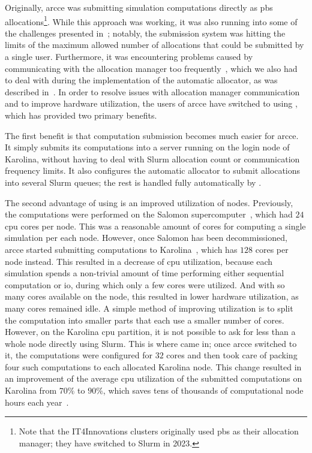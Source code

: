 Originally, \gls{arcce} was submitting simulation computations directly as
\gls{pbs} allocations\footnote{Note that the IT4Innovations clusters originally used \gls{pbs} as their allocation
manager; they have switched to Slurm in 2023.}. While this approach was working, it was
also running into some of the challenges presented in~; notably, the
submission system was hitting the limits of the maximum allowed number of allocations that could be
submitted by a single user. Furthermore, it was encountering problems caused by communicating with
the allocation manager too frequently~\cite{atlas-it4i-2}, which we also had to deal with
during the implementation of the \hyperqueue{} automatic allocator, as was described
in~. In order to resolve issues with allocation manager communication and to
improve hardware utilization, the users of \gls{arcce} have switched to using
\hyperqueue{}, which has provided two primary benefits.

The first benefit is that computation submission becomes much easier for \gls{arcce}.
It simply submits its computations into a \hyperqueue{} server running on the login node
of Karolina, without having to deal with Slurm allocation count or communication frequency limits.
It also configures the automatic allocator to submit allocations into several Slurm queues; the
rest is handled fully automatically by \hyperqueue{}.

The second advantage of using \hyperqueue{} is an improved utilization of nodes.
Previously, the computations were performed on the Salomon supercomputer~\cite{salomon},
which had $24$ \gls{cpu} cores per node. This was a reasonable
amount of cores for computing a single simulation per each node. However, once Salomon has been
decommissioned, \gls{arcce} started submitting computations to
Karolina~\cite{karolina}, which has $128$ cores per node instead. This
resulted in a decrease of \gls{cpu} utilization, because each simulation spends a
non-trivial amount of time performing either sequential computation or \gls{io},
during which only a few cores were utilized. And with so many cores available on the node, this
resulted in lower hardware utilization, as many cores remained idle. A simple method of improving
utilization is to split the computation into smaller parts that each use a smaller number of cores.
However, on the Karolina \gls{cpu} partition, it is not possible to ask for less than
a whole node directly using Slurm. This is where \hyperqueue{} came in; once
\gls{arcce} switched to it, the computations were configured for $32$
cores and \hyperqueue{} then took care of packing four such computations to each
allocated Karolina node. This change resulted in an improvement of the average
\gls{cpu} utilization of the submitted computations on Karolina from
$70\%$ to $90\%$, which saves tens of thousands of computational
node hours each year~\cite{cern-hq}.


